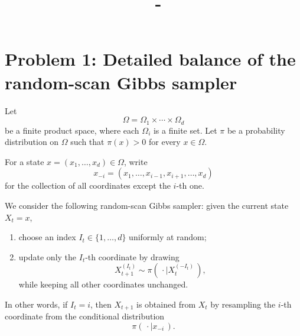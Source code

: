 \documentclass[answers,12pt,addpoints]{exam}
\author{\name}
\title{\course \ - \assignment}
\begin{document}
\maketitle


\section*{Problem 1: Detailed balance of the random-scan Gibbs sampler}

Let
\[
\Omega = \Omega_1 \times \cdots \times \Omega_d
\]
be a finite product space, where each $\Omega_i$ is a finite set. Let $\pi$ be a probability distribution on $\Omega$ such that $\pi(x) > 0$ for every $x \in \Omega$.

For a state $x = (x_1, \ldots, x_d) \in \Omega$, write
\[
x_{-i} = (x_1, \ldots, x_{i-1}, x_{i+1}, \ldots, x_d)
\]
for the collection of all coordinates except the $i$-th one.

We consider the following random-scan Gibbs sampler: given the current state $X_t = x$,
\begin{enumerate}
    \item choose an index $I_t \in \{1, \ldots, d\}$ uniformly at random;
    \item update only the $I_t$-th coordinate by drawing
    \[
    X^{(I_t)}_{t+1} \sim \pi(\,\cdot \mid X^{(-I_t)}_t\,),
    \]
    while keeping all other coordinates unchanged.
\end{enumerate}
In other words, if $I_t = i$, then $X_{t+1}$ is obtained from $X_t$ by resampling the $i$-th coordinate from the conditional distribution
\[
\pi(\,\cdot \mid x_{-i}\,).
\]
\end{document}

